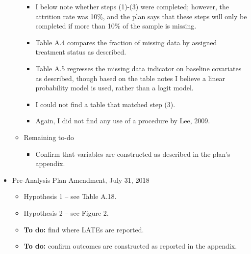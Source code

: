 \documentclass[]{article}
\begin{document}
\begin{itemize}
\begin{itemize}
\begin{itemize}
		\item I below note whether steps (1)-(3) were completed; however, the attrition rate was 10\%, and the plan says that these steps will only be completed if more than 10\% of the sample is missing.
		\item Table A.4 compares the fraction of missing data by assigned treatment status as described.
		\item Table A.5 regresses the missing data indicator on baseline covariates as described, though based on the table notes I believe a linear probability model is used, rather than a logit model.
		\item I could not find a table that matched step (3).
		\item Again, I did not find any use of a procedure by Lee, 2009.
	\end{itemize}
	\item Remaining to-do
	\begin{itemize}
		\item Confirm that variables are constructed as described in the plan's appendix.
	\end{itemize}
	\end{itemize}
	\item Pre-Analysis Plan Amendment, July 31, 2018
	\begin{itemize}
		\item Hypothesis 1 -- see Table A.18.
		\item Hypothesis 2 -- see Figure 2.
		\item \textbf{To do:} find where LATEs are reported.
		\item \textbf{To do:} confirm outcomes are constructed as reported in the appendix.
	\end{itemize}
\end{itemize}
\end{document}
